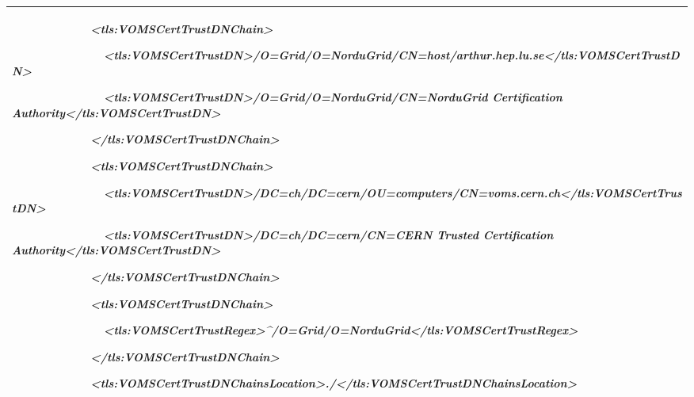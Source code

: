 \documentclass{article}
\begin{document}
\begin{center}
\tablehead{}\begin{supertabular}{|m{5.6886597in}|}
\hline
{\itshape\color{black}
\ \ \ \ \ \ \ \ \ \ \ \ {\textless}tls:VOMSCertTrustDNChain{\textgreater}}

{\itshape\color{black}
\ \ \ \ \ \ \ \ \ \ \ \ \ \ {\textless}tls:VOMSCertTrustDN{\textgreater}/O=Grid/O=NorduGrid/CN=host/arthur.hep.lu.se{\textless}/tls:VOMSCertTrustDN{\textgreater}}

{\itshape\color{black}
\ \ \ \ \ \ \ \ \ \ \ \ \ \ {\textless}tls:VOMSCertTrustDN{\textgreater}/O=Grid/O=NorduGrid/CN=NorduGrid
Certification Authority{\textless}/tls:VOMSCertTrustDN{\textgreater}}

{\itshape\color{black}
\ \ \ \ \ \ \ \ \ \ \ \ {\textless}/tls:VOMSCertTrustDNChain{\textgreater}}

{\itshape\color{black}
\ \ \ \ \ \ \ \ \ \ \ \ {\textless}tls:VOMSCertTrustDNChain{\textgreater}}

{\itshape\color{black}
\ \ \ \ \ \ \ \ \ \ \ \ \ \ {\textless}tls:VOMSCertTrustDN{\textgreater}/DC=ch/DC=cern/OU=computers/CN=voms.cern.ch{\textless}/tls:VOMSCertTrustDN{\textgreater}}

{\itshape\color{black}
\ \ \ \ \ \ \ \ \ \ \ \ \ \ {\textless}tls:VOMSCertTrustDN{\textgreater}/DC=ch/DC=cern/CN=CERN
Trusted Certification
Authority{\textless}/tls:VOMSCertTrustDN{\textgreater}}

{\itshape\color{black}
\ \ \ \ \ \ \ \ \ \ \ \ {\textless}/tls:VOMSCertTrustDNChain{\textgreater}}

{\itshape\color{black}
\ \ \ \ \ \ \ \ \ \ \ \ {\textless}tls:VOMSCertTrustDNChain{\textgreater}}

{\itshape\color{black}
\ \ \ \ \ \ \ \ \ \ \ \ \ \ {\textless}tls:VOMSCertTrustRegex{\textgreater}\^{}/O=Grid/O=NorduGrid{\textless}/tls:VOMSCertTrustRegex{\textgreater}}

{\itshape\color{black}
\ \ \ \ \ \ \ \ \ \ \ \ {\textless}/tls:VOMSCertTrustDNChain{\textgreater}}

\itshape\color{black}
\ \ \ \ \ \ \ \ \ \ \ \ {\textless}tls:VOMSCertTrustDNChainsLocation{\textgreater}./{\textless}/tls:VOMSCertTrustDNChainsLocation{\textgreater}\\\hline
\end{supertabular}
\end{center}
\end{document}
